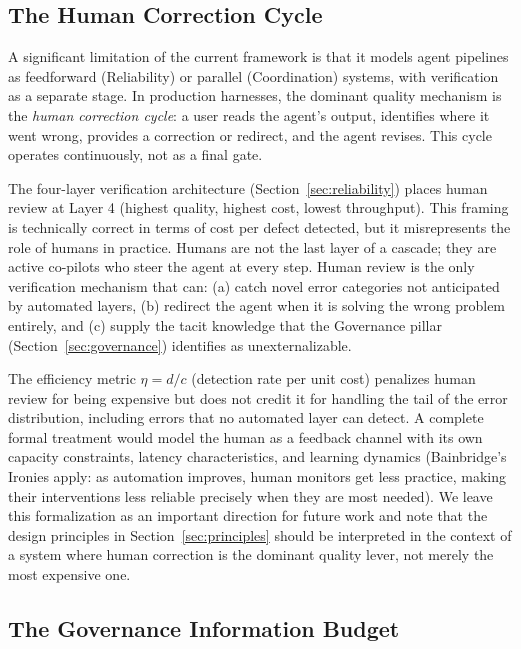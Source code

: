 \documentclass[11pt, a4paper]{googledeepmind}
\begin{document}
\subsection{The Human Correction Cycle}
\label{sec:human-loop}

A significant limitation of the current framework is that it models agent pipelines as feedforward (Reliability) or parallel (Coordination) systems, with verification as a separate stage. In production harnesses, the dominant quality mechanism is the \emph{human correction cycle}: a user reads the agent's output, identifies where it went wrong, provides a correction or redirect, and the agent revises. This cycle operates continuously, not as a final gate.

The four-layer verification architecture (Section~\ref{sec:reliability}) places human review at Layer 4 (highest quality, highest cost, lowest throughput). This framing is technically correct in terms of cost per defect detected, but it misrepresents the role of humans in practice. Humans are not the last layer of a cascade; they are active co-pilots who steer the agent at every step. Human review is the only verification mechanism that can: (a) catch novel error categories not anticipated by automated layers, (b) redirect the agent when it is solving the wrong problem entirely, and (c) supply the tacit knowledge that the Governance pillar (Section~\ref{sec:governance}) identifies as unexternalizable.

The efficiency metric $\eta = d/c$ (detection rate per unit cost) penalizes human review for being expensive but does not credit it for handling the tail of the error distribution, including errors that no automated layer can detect. A complete formal treatment would model the human as a feedback channel with its own capacity constraints, latency characteristics, and learning dynamics (Bainbridge's Ironies apply: as automation improves, human monitors get less practice, making their interventions less reliable precisely when they are most needed). We leave this formalization as an important direction for future work and note that the design principles in Section~\ref{sec:principles} should be interpreted in the context of a system where human correction is the dominant quality lever, not merely the most expensive one.

\subsection{The Governance Information Budget}
\label{sec:gib}
\end{document}
